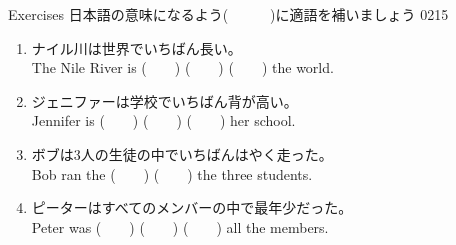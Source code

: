 \documentclass[aspectratio=169,xcolor={dvipsnames,table}]{beamer}
\begin{document}
 \begin{frame}[plain]{Exercises}
日本語の意味になるよう(~~~~~~)に適語を補いましょう%
\hfill{\tiny 0215}\,{\scriptsize {}}
  \begin{enumerate}
   \item ナイル川は世界でいちばん長い。\\
	 The Nile River is (~~~~) (~~~~) (~~~~) the world.
   \item ジェニファーは学校でいちばん背が高い。\\
	 Jennifer is (~~~~) (~~~~) (~~~~) her school.
   \item ボブは3人の生徒の中でいちばんはやく走った。\\
	 Bob ran the (~~~~) (~~~~) the three students.
   \item ピーターはすべてのメンバーの中で最年少だった。\\
	 Peter was  (~~~~) (~~~~) (~~~~) all the members.
  \end{enumerate}
 \end{frame}
\end{document}
